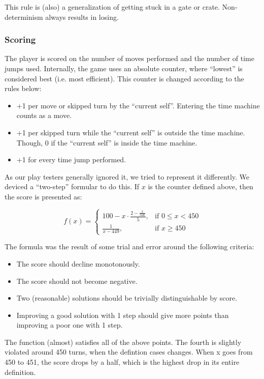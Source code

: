 This rule is (also) a generalization of getting stuck in a gate or
crate. Non-determinism always results in losing.

\subsubsection{Scoring}
The player is scored on the number of moves performed and the number
of time jumps used.  Internally, the game uses an absolute counter,
where ``lowest'' is considered best (i.e. most efficient).
This counter is changed according to the rules below:

\begin{itemize}
\item +1 per move or skipped turn by the ``current self''.
  Entering the time machine counts as a move.
\item +1 per skipped turn while the ``current self'' is outside
  the time machine.  Though, 0 if the ``current self'' is inside the
  time machine.
\item +1 for every time jump performed.
\end{itemize}

As our play testers generally ignored it, we tried to represent it
differently.  We deviced a ``two-step'' formular to do this.  If $x$
is the counter defined above, then the score is presented as:

\[
f(x) =
\begin{cases}
100 - x \cdot \frac{2 - \frac{x}{500}}{5}, & \mbox{if } 0 \leq x < 450\\
\frac{1}{x - 449}, & \mbox{if } x \geq 450
\end{cases}
\]

The formula was the result of some trial and error around the following
criteria:

\begin{itemize}
\item The score should decline monotonously.
\item The score should not become negative.
\item Two (reasonable) solutions should be trivially distinguishable by score.
\item Improving a good solution with 1 step should give more points
  than improving a poor one with 1 step.
\end{itemize}

The function (almost) satisfies all of the above points.  The fourth
is slightly violated around 450 turns, when the defintion cases
changes.  When x goes from 450 to 451, the score drops by a half,
which is the highest drop in its entire definition.

